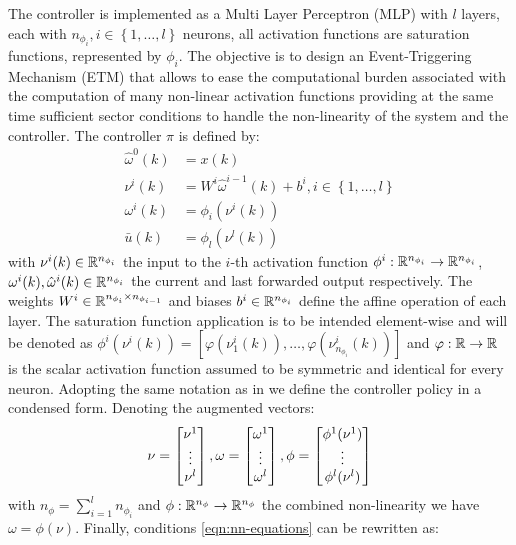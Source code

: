\documentclass{ifacconf}
\theoremstyle{plain}
\begin{document}
The controller is implemented as a Multi Layer Perceptron (MLP) with $l$ layers, each with $n_{\phi_i}, i \in \left\{ 1, \dots, l\right\}$ neurons, all activation functions are saturation functions, represented by $\phi_i$. The objective is to design an Event-Triggering Mechanism (ETM) that allows to ease the computational burden associated with the computation of many non-linear activation functions providing at the same time sufficient sector conditions to handle the non-linearity of the system and the controller. The controller $\pi$ is defined by:
\begin{equation}\label{eqn:nn-equations}
  \begin{aligned}
  \hat{\omega}^{0}(k) &= x(k) \\
  \nu^{i}(k) &= W^{i} \hat{\omega}^{i - 1}(k) + b^{i}, i \in \left\{ 1, \dots, l \right\}\\
  \omega^{i}(k) &= \phi_i(\nu^i(k))\\
  \bar{u}(k) &= \phi_l(\nu^l(k))
  \end{aligned} 
\end{equation}
with $\nu^i(k) \in {\mathbb{R}}^{n_{\phi_i}}$ the input to the $i$-th activation function $\phi^i: {\mathbb{R}}^{n_{\phi_i}} \to {\mathbb{R}}^{n_{\phi_i}}$, $\omega^i(k), \hat{\omega}^i(k) \in {\mathbb{R}}^{n_{\phi_i}}$ the current and last forwarded output respectively. The weights $W^i \in {\mathbb{R}}^{n_{\phi_i} \times n_{\phi_{i-1}}}$ and biases $b^i \in {\mathbb{R}}^{n_{\phi_i}}$ define the affine operation of each layer. The saturation function application is to be intended element-wise and will be denoted as $\phi^i(\nu^i(k)) = \left[ \varphi(\nu^i_1(k)), \dots, \varphi(\nu^i_{n_{\phi_i}}(k)) \right]$ and $\varphi: {\mathbb{R}} \to {\mathbb{R}}$ is the scalar activation function assumed to be symmetric and identical for every neuron. Adopting the same notation as in \cite{css-paper} we define the controller policy in a condensed form. Denoting the augmented vectors:
\begin{equation*}
  \nu = \left[\begin{matrix}\nu^1 \\ \vdots \\ \nu^l\end{matrix}\right], \omega = \left[\begin{matrix}\omega^1 \\ \vdots \\ \omega^l\end{matrix}\right], \phi = \left[\begin{matrix}\phi^1(\nu^1) \\ \vdots \\ \phi^l(\nu^l)\end{matrix}\right] 
\end{equation*}
with $n_{\phi} = \sum_{i=1}^{l} n_{\phi_i}$ and $\phi: {\mathbb{R}}^{n_{\phi}} \to {\mathbb{R}}^{n_{\phi}}$ the combined non-linearity we have $\omega = \phi(\nu)$. Finally, conditions \eqref{eqn:nn-equations} can be rewritten as:
\end{document}
